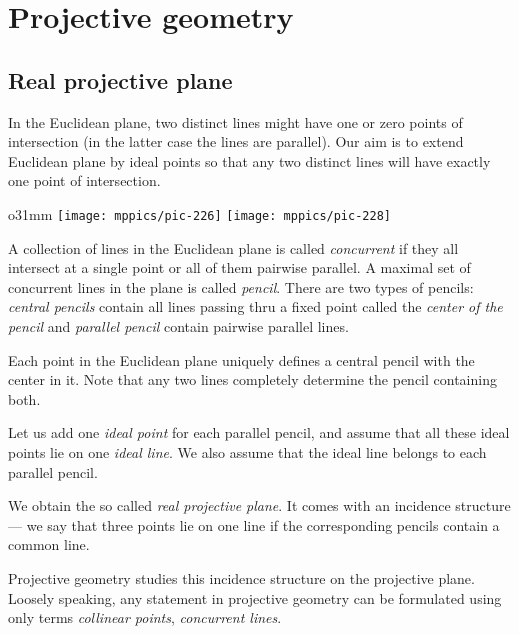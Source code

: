 \chapter{Projective geometry}\label{chap:proj}

\section*{Real projective plane}

In the Euclidean plane, two distinct lines might have one or zero points of intersection 
(in the latter case the lines are parallel).
Our aim is to extend Euclidean plane by ideal points so that any two distinct lines will have exactly one point of intersection.

\begin{wrapfigure}{o}{31mm}
\centering
\texttt{[image: mppics/pic-226]}
\vskip4mm
\texttt{[image: mppics/pic-228]}
\end{wrapfigure}

A collection of lines in the Euclidean plane is called \emph{concurrent} if they all intersect at a single point or all of them pairwise parallel.
A maximal set of concurrent lines in the plane is called \emph{pencil}.
There are two types of pencils: 
\emph{central pencils} contain all lines passing thru a fixed point called the \emph{center of the pencil}
and  
\emph{parallel pencil} contain pairwise parallel lines.

Each point in the Euclidean plane uniquely defines a central pencil with the center in it.
Note that any two lines completely determine the pencil containing both.

Let us add one \emph{ideal point} for each parallel pencil,
and assume that all these ideal points lie on one \emph{ideal line}.
We also assume that the ideal line belongs to each parallel pencil.

We obtain the so called \emph{real projective plane}.
It comes with an incidence structure --- we say that three points lie on one line if the corresponding pencils contain a common line. 

Projective geometry studies this incidence structure on the projective plane.
Loosely speaking, any statement in projective geometry can be formulated using only terms {}\emph{collinear points},
\emph{concurrent lines}.



